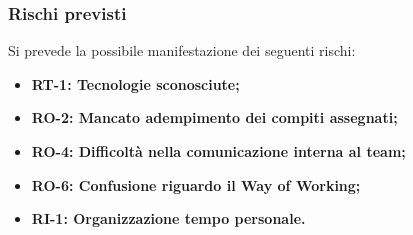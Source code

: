 \documentclass[a4paper,12pt]{article}
\begin{document}
        \subsubsection{Rischi previsti}{
            Si prevede la possibile manifestazione dei seguenti rischi:
            \begin{itemize}
                \item \textbf{RT-1: Tecnologie sconosciute;}
                \item \textbf{RO-2: Mancato adempimento dei compiti assegnati;}
                \item \textbf{RO-4: Difficoltà nella comunicazione interna al team;}
                \item \textbf{RO-6: Confusione riguardo il Way of Working;}
                \item \textbf{RI-1: Organizzazione tempo personale.}
            \end{itemize}
        }
\end{document}
